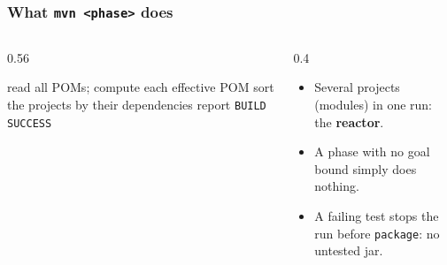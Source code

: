 \documentclass[aspectratio=169,10pt,compress]{beamer}
\begin{document}
\begin{frame}[t,fragile] \frametitle{What \texttt{mvn <phase>} does}
  \begin{columns}[T]
    \begin{column}{0.56\textwidth}


\begin{algorithm}[H]
  \caption{One Maven run}
  read all POMs; compute each effective POM\;
  sort the projects by their dependencies
  report \texttt{BUILD SUCCESS}\;
\end{algorithm}

    \end{column}
    \begin{column}{0.4\textwidth}
      \begin{itemize}\small
        \item Several projects (modules) in one run: the \textbf{reactor}.
        \item A phase with no goal bound simply does nothing.
        \item A failing test stops the run before \texttt{package}: no untested jar.
      \end{itemize}
    \end{column}
  \end{columns}
\end{frame}

\end{document}
